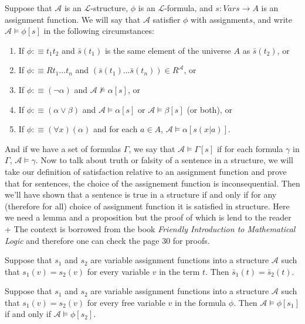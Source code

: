 \documentclass[9pt,a4paper, twocolumn]{article}
\newcommand{\curveL}{\mathcal{L}}
\newcommand{\curveA}{\mathcal{A}}
\begin{document}
            \begin{define}
                Suppose that $\curveA$ is an $\curveL$-structure, $\phi$ is an $\curveL$-formula, and $s: Vars\rightarrow A$ is an assignment function. We will say that $\curveA$ satisfier $\phi$ with assignment$s$, and write $\curveA \vDash \phi[s]$ in the following circumstances:
                \begin{enumerate}
                    \item If $\phi:\equiv t_1t_2$ and $\bar s(t_1)$ is the same element of the universe $A$ as $\bar s(t_2)$, or
                    \item If $\phi:\equiv Rt_1\dots t_n$ and $(\bar s(t_1) \dots \bar s(t_n)) \in R^\curveA$, or
                    \item If $\phi:\equiv (\neg\alpha)$ and $\curveA\not\vDash \alpha[s]$, or
                    \item If $\phi:\equiv (\alpha\lor\beta)$ and $\curveA\vDash\alpha[s]$ or $\curveA\vDash\beta[s]$ (or both), or
                    \item If $\phi:\equiv (\forall x)(\alpha)$ and for each $a\in A$, $\curveA\vDash \alpha[s(x|a)]$.
                \end{enumerate}
            \end{define}
            And if we have a set of formulas $\Gamma$, we say that $\curveA\vDash \Gamma[s]$ if for each formula $\gamma$ in $\Gamma$, $\curveA\vDash\gamma$. Now to talk about truth or falsity of a sentence in a structure, we will take our definition of satisfaction relative to an assignment function and prove that for sentences, the choice of the assignement function is inconsequential. Then we'll have shown that a sentence is true in a structure if and only if for any (therefore for all) choice of assignment function it is satisfied in structure. Here we need a lemma and a proposition but the proof of which is lend to the reader + The context is borrowed from the book \textit{Friendly Introduction to Mathematical Logic} and therefore one can check the page 30 for proofs.
            \begin{lemma}
                Suppose that $s_1$ and $s_2$ are variable assignment functions into a structure $\curveA$ such that $s_1(v)= s_2(v)$ for every variable $v$ in the term $t$. Then $\bar s_1(t) = \bar s_2(t)$.
            \end{lemma} 
            \begin{proposition}
                Suppose that $s_1$ and $s_2$ are variable assignment functions into a structure $\curveA$ such that $s_1(v)= s_2(v)$ for every free variable $v$ in the formula $\phi$. Then $\curveA\vDash \phi[s_1]$ if and only if $\curveA\vDash \phi[s_2]$.
            \end{proposition}
\end{document}

